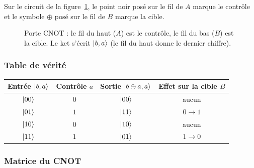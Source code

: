 Sur le circuit de la figure~\ref{fig:cnot}, le point noir posé sur le fil de $A$ marque le
contrôle et le symbole $\oplus$ posé sur le fil de $B$ marque la cible.

\begin{figure}[!ht]
\centering
{}
\caption{Porte CNOT : le fil du haut ($A$) est le contrôle, le fil du bas ($B$) est la
cible. Le ket s'écrit $|b,a\rangle$ (le fil du haut donne le dernier chiffre).}
\label{fig:cnot}
\end{figure}

\subsubsection{Table de vérité}

\begin{center}
\renewcommand{\arraystretch}{1.3}
\begin{tabular}{@{}cccc@{}}
\toprule
Entrée $|b,a\rangle$ & Contrôle $a$ & Sortie $|b\oplus a,a\rangle$ & Effet sur la cible $B$ \\
\midrule
$|00\rangle$ & $0$ & $|00\rangle$ & aucun \\
$|01\rangle$ & $1$ & $|11\rangle$ & $0\to1$ \\
$|10\rangle$ & $0$ & $|10\rangle$ & aucun \\
$|11\rangle$ & $1$ & $|01\rangle$ & $1\to0$ \\
\bottomrule
\end{tabular}
\end{center}

\subsubsection{Matrice du CNOT}


